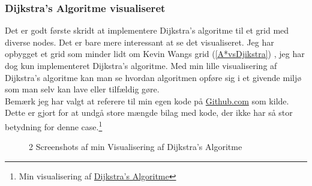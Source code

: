 \documentclass[12pt]{article}
\begin{document}
\subsubsection{Dijkstra’s Algoritme visualiseret}
Det er godt første skridt at implementere Dijkstra's algoritme til et grid med diverse nodes. Det er bare mere interessant at se det visualiseret. Jeg har opbygget et grid som minder lidt om Kevin Wangs grid (\ref{A*vsDjikstra}) , jeg har dog kun implementeret Dijkstra’s algoritme. Med min lille visualisering af Dijkstra’s algoritme kan man se hvordan algoritmen opføre sig i et givende miljø som man selv kan lave eller tilfældig gøre. \\
Bemærk jeg har valgt at referere til min egen kode på \href{https://github.com/}{Github.com} som kilde. Dette er gjort for at undgå store mængde bilag med kode, der ikke har så stor betydning for denne case.\footnote{Min visualisering af \href{https://github.com/johannes67890/Pathfinding.git}{Dijkstra’s Algoritme}}     
\begin{figure}[ht]%
  \centering
  \caption{2 Screenshots af min Visualisering af Dijkstra’s Algoritme}%
\end{figure}
\end{document}
